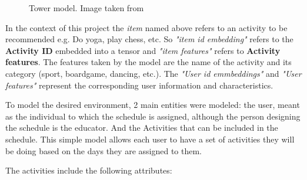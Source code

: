 \documentclass[10pt,twocolumn,letterpaper]{article}
\begin{document}
\begin{figure}[h]
       \centering
       \caption{Tower model. Image taken from \cite{tfrs}}
    \label{fig:tower}
\end{figure}

In the context of this project the \textit{item} named above refers to an activity to be recommended e.g. Do yoga, play chess, etc. So \textit{"item id embedding"} refers to the \textbf{Activity ID} embedded into a tensor and  \textit{"item features"} refers to \textbf{Activity features}. The features taken by the model are the name of the activity and its category (sport, boardgame, dancing, etc.). The \textit{"User id emmbeddings"} and \textit{"User features"} represent the corresponding user information and characteristics. 

To model the desired environment, 2 main entities were modeled: the user, meant as the individual to which the schedule is assigned, although the person designing the schedule is the educator. And the Activities that can be included in the schedule. This simple model allows each user to have a set of activities they will be doing based on the days they are assigned to them. 

The activities include the following attributes:
\end{document}
